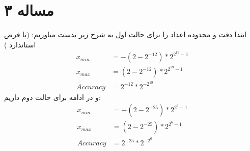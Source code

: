 \documentclass[11pt]{article}
\begin{document}
\section{مساله ۳}
ابتدا دقت و محدوده اعداد را برای حالت اول به شرح زیر بدست میاوریم: (با فرض استاندارد )
\begin{align*}
	x_{min} &= - (2 - 2^{-12}) * 2^{2^{19} - 1} \\
	x_{max} &= (2 - 2^{-12}) * 2^{2^{19} - 1} \\
	Accuracy &= 2^{-12} * 2^{-2^{19}}
\end{align*}
و در ادامه برای حالت دوم داریم:
\begin{align*}
		x_{min} &= - (2 - 2^{-25}) * 2^{2^{6} - 1} \\
		x_{max} &= (2 - 2^{-25}) * 2^{2^{6} - 1} \\
		Accuracy &= 2^{-25} * 2^{-2^{6}}
\end{align*}
\end{document}
